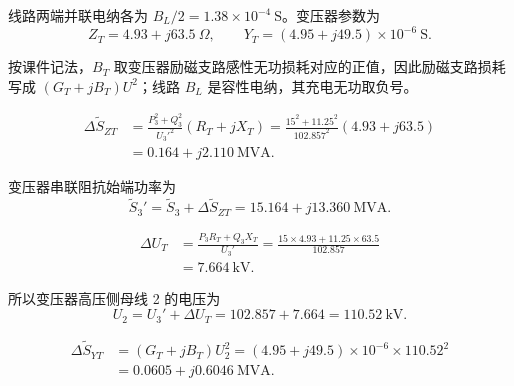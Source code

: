 \begin{enumerate}
\begin{solution}
              线路两端并联电纳各为 \(B_L/2=1.38\times10^{-4}\ \mathrm{S}\)。变压器参数为
              \begin{equation*}
                  Z_T=4.93+j63.5\ \Omega,\qquad
                  Y_T=(4.95+j49.5)\times10^{-6}\ \mathrm{S}.
              \end{equation*}

              按课件记法，\(B_T\) 取变压器励磁支路感性无功损耗对应的正值，因此励磁支路损耗写成
              \((G_T+jB_T)U^2\)；线路 \(B_L\) 是容性电纳，其充电无功取负号。


              \begin{align*}
                  \Delta \tilde S_{ZT}
                   & =\frac{P_3^2+Q_3^2}{U_3'^2}(R_T+jX_T)
                  =\frac{15^2+11.25^2}{102.857^2}(4.93+j63.5)             \\
                   & =\boxed{0.164+j2.110\ \mathrm{MVA}}.
              \end{align*}

              变压器串联阻抗始端功率为
              \begin{equation*}
                  \tilde S_3'=\tilde S_3+\Delta \tilde S_{ZT}
                  =15.164+j13.360\ \mathrm{MVA}.
              \end{equation*}


              \begin{align*}
                  \Delta U_T
                   & =\frac{P_3R_T+Q_3X_T}{U_3'}
                  =\frac{15\times4.93+11.25\times63.5}{102.857}           \\
                   & =7.664\ \mathrm{kV}.
              \end{align*}

              所以变压器高压侧母线 2 的电压为
              \begin{equation*}
                  U_2=U_3'+\Delta U_T
                  =102.857+7.664
                  =\boxed{110.52\ \mathrm{kV}}.
              \end{equation*}


              \begin{align*}
                  \Delta \tilde S_{YT}
                   & =(G_T+jB_T)U_2^2
                  =(4.95+j49.5)\times10^{-6}\times110.52^2                \\
                   & =\boxed{0.0605+j0.6046\ \mathrm{MVA}}.
              \end{align*}


\end{solution}
\end{enumerate}
